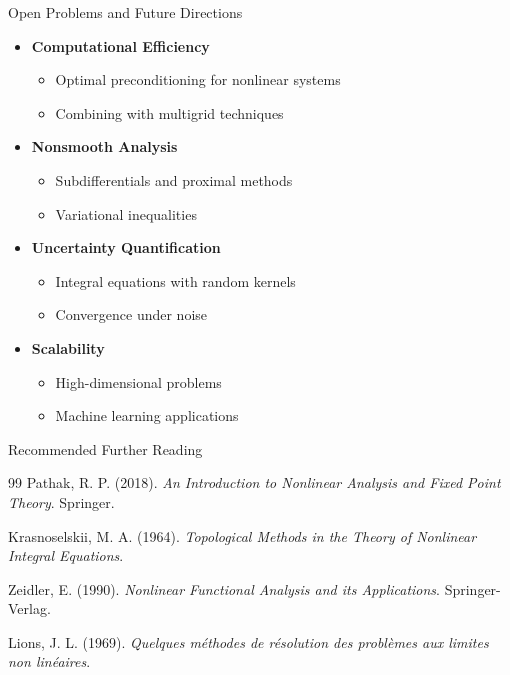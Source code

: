 \documentclass[aspectratio=169,10pt]{beamer}
\begin{document}
\begin{frame}{Open Problems and Future Directions}
    \begin{itemize}
        \item \textbf{Computational Efficiency}
            \begin{itemize}
                \item Optimal preconditioning for nonlinear systems
                \item Combining with multigrid techniques
            \end{itemize}

        \vspace{0.3cm}
        \item \textbf{Nonsmooth Analysis}
            \begin{itemize}
                \item Subdifferentials and proximal methods
                \item Variational inequalities
            \end{itemize}

        \vspace{0.3cm}
        \item \textbf{Uncertainty Quantification}
            \begin{itemize}
                \item Integral equations with random kernels
                \item Convergence under noise
            \end{itemize}

        \vspace{0.3cm}
        \item \textbf{Scalability}
            \begin{itemize}
                \item High-dimensional problems
                \item Machine learning applications
            \end{itemize}
    \end{itemize}
\end{frame}

\begin{frame}[fragile]{Recommended Further Reading}
    \begin{thebibliography}{99}
         Pathak, R. P. (2018). \textit{An Introduction to Nonlinear Analysis
            and Fixed Point Theory}. Springer.

         Krasnoselskii, M. A. (1964). \textit{Topological Methods in
            the Theory of Nonlinear Integral Equations}.

         Zeidler, E. (1990). \textit{Nonlinear Functional Analysis and its
            Applications}. Springer-Verlag.

         Lions, J. L. (1969). \textit{Quelques méthodes de résolution des
            problèmes aux limites non linéaires}.
    \end{thebibliography}
\end{frame}
\end{document}
